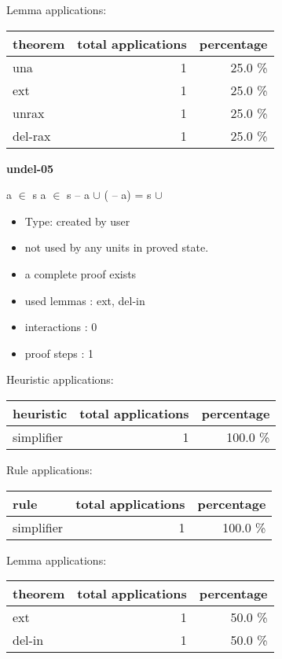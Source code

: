 \documentclass[a4paper]{article}
\begin{document}
Lemma applications:

\begin{supertabular}{l|r|r}
theorem	        & total applications & percentage \\ \hline
una & 1 & 25.0 \% \\
ext & 1 & 25.0 \% \\
unrax & 1 & 25.0 \% \\
del-rax & 1 & 25.0 \% \\

\end{supertabular}
\pagebreak

{\LARGE\bf undel-05}\label{lemma-undel-05}

\medskip

 \Fol \Not a $\in$ s \And \Not a $\in$  \Imp s -- a $\cup$ ( -- a) = s $\cup$ 

\begin{itemize}

\item Type: created by user

\item not used by any units in proved state.
\item       a complete proof exists
\item       used lemmas  : ext, del-in
\item       interactions : 0
\item       proof steps  : 1
\end{itemize}

\medskip


Heuristic applications:

\begin{supertabular}{l|r|r}
heuristic	& total applications & percentage \\ \hline
simplifier & 1 & 100.0 \% \\

\end{supertabular}

Rule applications:

\begin{supertabular}{l|r|r}
rule	        & total applications & percentage \\ \hline
simplifier & 1 & 100.0 \% \\

\end{supertabular}

Lemma applications:

\begin{supertabular}{l|r|r}
theorem	        & total applications & percentage \\ \hline
ext & 1 & 50.0 \% \\
del-in & 1 & 50.0 \% \\

\end{supertabular}
\pagebreak
\end{document}
